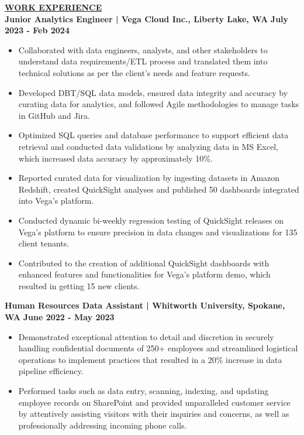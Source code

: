 \documentclass{article}
\begin{document}
\noindent \textbf{\underline{WORK EXPERIENCE}}\\
\noindent \textbf{Junior Analytics Engineer | Vega Cloud Inc., Liberty Lake, WA} \hfill \textbf{July 2023 - Feb 2024}
\begin{itemize}[noitemsep,nolistsep,leftmargin=*]
\item {\small Collaborated with data engineers, analysts, and other stakeholders to understand data requirements/ETL process and translated them into technical solutions as per the client’s needs and feature requests.}
\item {\small Developed DBT/SQL data models, ensured data integrity and accuracy by curating data for analytics, and followed Agile methodologies to manage tasks in GitHub and Jira.}
\item {\small Optimized SQL queries and database performance to support efficient data retrieval and conducted data validations by analyzing data in MS Excel, which increased data accuracy by approximately 10\%.}
\item {\small Reported curated data for visualization by ingesting datasets in Amazon Redshift, created QuickSight analyses and published 50 dashboards integrated into Vega’s platform.}
\item {\small Conducted dynamic bi-weekly regression testing of QuickSight releases on Vega’s platform to ensure precision in data changes and visualizations for 135 client tenants.}
\item {\small Contributed to the creation of additional QuickSight dashboards with enhanced features and functionalities for Vega’s platform demo, which resulted in getting 15 new clients.}\\
\end{itemize}
\noindent \textbf{Human Resources Data Assistant | Whitworth University, Spokane, WA} \hfill \textbf{June 2022 - May 2023}
\begin{itemize}[noitemsep,nolistsep,leftmargin=*]
\item {\small Demonstrated exceptional attention to detail and discretion in securely handling confidential documents of 250+ employees and streamlined logistical operations to implement practices that resulted in a 20\% increase in data pipeline efficiency.}
\item {\small Performed tasks such as data entry, scanning, indexing, and updating employee records on SharePoint and provided unparalleled customer service by attentively assisting visitors with their inquiries and concerns, as well as professionally addressing incoming phone calls.}\\
\end{itemize}
\end{document}
